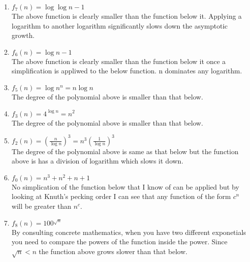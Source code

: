 \documentclass[12pt]{article}
\begin{document}
\begin{enumerate}
\item \begin{math}f_7(n) = \log{\log{n-1}}\end{math}\\
The above function is clearly smaller than the function below it. Applying a logarithm to another logarithm significantly slows down the asymptotic growth.
\item \begin{math}f_6(n) = \log{n-1}\end{math}\\
The above function is clearly smaller than the function below it once a simplification is appliwed to the below function. n dominates any logarithm.
\item \begin{math}f_5(n) = \log{n^n} = n \log{n}\end{math}\\
The degree of the polynomial above is smaller than that below.
\item \begin{math}f_3(n) = 4^{\log{n}} = n^2 \end{math}\\
The degree of the polynomial above is smaller than that below.
\item \begin{math}f_2(n) = (\frac{n}{\log{n}})^3=n^3(\frac{1}{\log{n}})^3\end{math}\\
The degree of the polynomial above is same as that below but the function above is has a division of logarithm which slows it down.
\item \begin{math}f_0(n) = n^3 + n^2 + n + 1\end{math}\\
No simplication of the function below that I know of can be applied but by looking at Knuth's pecking order I can see that any function of the form \begin{math}c^n\end{math} will be greater than \begin{math}n^c\end{math}.
\item \begin{math}f_8(n) = 100^{\sqrt{n}}\end{math}\\
By consulting concrete mathematics, when you have two different exponetials you need to compare the powers of the function inside the power. Since \begin{math}\sqrt{n} < n\end{math} the function above grows slower than that below.

\end{enumerate}
\end{document}
